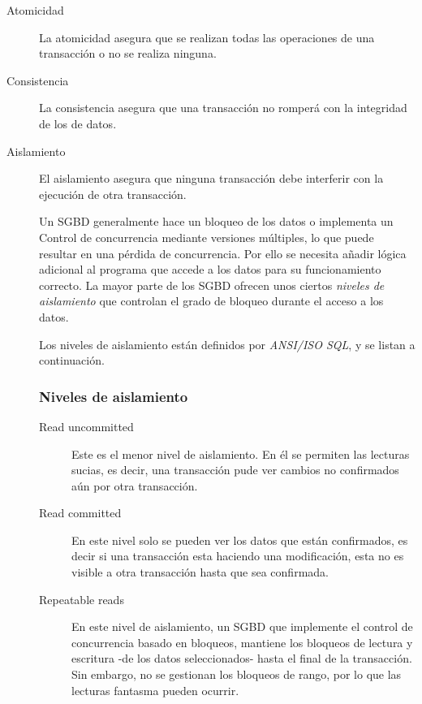 	\begin{description}
	\item[Atomicidad]
		La atomicidad asegura que se realizan todas las operaciones de una transacción
		o no se realiza ninguna.
		
	\item[Consistencia]
		 La consistencia asegura que una transacción no romperá con la integridad de
		 los de datos.
	  
	\item[Aislamiento]	
		El aislamiento asegura que ninguna transacción debe interferir con la
		ejecución de otra transacción.
		
		Un SGBD generalmente hace un bloqueo de los datos o implementa un Control de
		concurrencia mediante versiones múltiples, lo que puede resultar en una
		pérdida de concurrencia. Por ello se necesita añadir lógica adicional al
		programa que accede a los datos para su funcionamiento correcto.
		La mayor parte de los SGBD ofrecen unos ciertos \emph{niveles de aislamiento}
		que controlan el grado de bloqueo durante el acceso a los datos.
		
		Los niveles de aislamiento están definidos por \emph{ANSI/ISO SQL}, y se listan
		a continuación.
		
		\subsubsection{Niveles de aislamiento}
	
		\begin{description}

			\item [Read uncommitted]
				Este es el menor nivel de aislamiento. En él se permiten las lecturas
				sucias, es decir, una transacción pude ver cambios no confirmados
				aún por otra transacción.
			
			\item [Read committed]
				En este nivel solo se pueden ver los datos que están confirmados, es decir si
				una  transacción esta haciendo una modificación, esta no es visible a otra
				transacción hasta que sea confirmada.
				
			\item [Repeatable reads] 
				En este nivel de aislamiento, un SGBD que implemente el control de
				concurrencia basado en bloqueos, mantiene los bloqueos de lectura y escritura
				-de los datos seleccionados- hasta el final de la transacción. Sin embargo, no
				se gestionan los bloqueos de rango, por lo que las lecturas fantasma pueden
				ocurrir.
			

\end{description}
\end{description}
